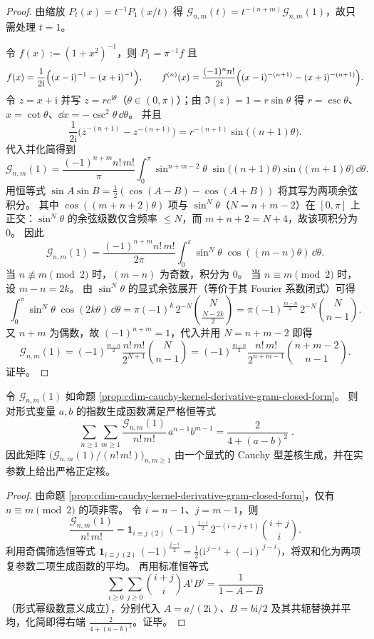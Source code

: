 \begin{proof}
由缩放 \(P_t(x)=t^{-1}P_1(x/t)\) 得
\(
\mathcal G_{n,m}(t)=t^{-(n+m)}\mathcal G_{n,m}(1)
\)，故只需处理 \(t=1\)。
\par
令 \(f(x):=(1+x^2)^{-1}\)，则 \(P_1=\pi^{-1}f\) 且
\[
f(x)=\frac{1}{2\mathrm{i}}\Bigl((x-\mathrm{i})^{-1}-(x+\mathrm{i})^{-1}\Bigr),
\qquad
f^{(n)}(x)=\frac{(-1)^n n!}{2\mathrm{i}}\Bigl((x-\mathrm{i})^{-(n+1)}-(x+\mathrm{i})^{-(n+1)}\Bigr).
\]
令 \(z=x+\mathrm{i}\) 并写 \(z=re^{\mathrm{i}\theta}\)（\(\theta\in(0,\pi)\)）；由 \(\Im(z)=1=r\sin\theta\) 得 \(r=\csc\theta\)、\(x=\cot\theta\)、\(\dd x=-\csc^2\theta\,\dd\theta\)。
并且
\[
\frac{1}{2\mathrm{i}}\bigl(\overline z^{-(n+1)}-z^{-(n+1)}\bigr)
=r^{-(n+1)}\sin\bigl((n+1)\theta\bigr).
\]
代入并化简得到
\[
\mathcal G_{n,m}(1)
=\frac{(-1)^{n+m}n!\,m!}{\pi}
\int_{0}^{\pi}\sin^{n+m-2}\theta\;
\sin\bigl((n+1)\theta\bigr)\sin\bigl((m+1)\theta\bigr)\,\dd\theta.
\]
用恒等式 \(\sin A\sin B=\tfrac12(\cos(A-B)-\cos(A+B))\) 将其写为两项余弦积分。
其中 \(\cos((m+n+2)\theta)\) 项与 \(\sin^{N}\theta\)（\(N=n+m-2\)）在 \([0,\pi]\) 上正交：\(\sin^{N}\theta\) 的余弦级数仅含频率 \(\le N\)，而 \(m+n+2=N+4\)，故该项积分为 \(0\)。
因此
\[
\mathcal G_{n,m}(1)
=\frac{(-1)^{n+m}n!\,m!}{2\pi}\int_{0}^{\pi}\sin^{N}\theta\;\cos((m-n)\theta)\,\dd\theta.
\]
当 \(n\not\equiv m\pmod 2\) 时，\((m-n)\) 为奇数，积分为 \(0\)。
当 \(n\equiv m\pmod 2\) 时，设 \(m-n=2k\)。
由 \(\sin^{N}\theta\) 的显式余弦展开（等价于其 Fourier 系数闭式）可得
\[
\int_{0}^{\pi}\sin^{N}\theta\;\cos(2k\theta)\,\dd\theta
=\pi(-1)^k\,2^{-N}\binom{N}{\frac{N-2k}{2}}
=\pi(-1)^{\frac{m-n}{2}}\,2^{-N}\binom{N}{n-1}.
\]
又 \(n+m\) 为偶数，故 \((-1)^{n+m}=1\)，代入并用 \(N=n+m-2\) 即得
\[
\mathcal G_{n,m}(1)=(-1)^{\frac{m-n}{2}}\frac{n!\,m!}{2^{N+1}}\binom{N}{n-1}
=(-1)^{\frac{m-n}{2}}\frac{n!\,m!}{2^{n+m-1}}\binom{n+m-2}{n-1}.
\]
证毕。
\end{proof}

\begin{proposition}\label{prop:cdim-cauchy-derivative-gram-exponential-kernel}
令 \(\mathcal G_{n,m}(1)\) 如命题 \ref{prop:cdim-cauchy-kernel-derivative-gram-closed-form}。
则对形式变量 \(a,b\) 的指数生成函数满足严格恒等式
\[
\boxed{\;
\sum_{n\ge 1}\sum_{m\ge 1}\frac{\mathcal G_{n,m}(1)}{n!\,m!}\,a^{n-1}b^{m-1}
=\frac{2}{4+(a-b)^2}\; }.
\]
因此矩阵 \(\bigl(\mathcal G_{n,m}(1)/(n!\,m!)\bigr)_{n,m\ge 1}\) 由一个显式的 Cauchy 型差核生成，并在实参数上给出严格正定核。
\end{proposition}
\begin{proof}
由命题 \ref{prop:cdim-cauchy-kernel-derivative-gram-closed-form}，仅有 \(n\equiv m\pmod 2\) 的项非零。
令 \(i=n-1\)、\(j=m-1\)，则
\[
\frac{\mathcal G_{n,m}(1)}{n!\,m!}
=\mathbf 1_{i\equiv j\ (2)}\,(-1)^{\frac{j-i}{2}}\,2^{-(i+j+1)}\binom{i+j}{i}.
\]
利用奇偶筛选恒等式
\(
\mathbf 1_{i\equiv j\ (2)}\,(-1)^{\frac{j-i}{2}}=\frac12\bigl(\mathrm{i}^{\,j-i}+(-\mathrm{i})^{\,j-i}\bigr)
\)，将双和化为两项复参数二项生成函数的平均。
再用标准恒等式
\[
\sum_{i\ge 0}\sum_{j\ge 0}\binom{i+j}{i}A^iB^j=\frac{1}{1-A-B}
\]
（形式幂级数意义成立），分别代入 \(A=a/(2\mathrm{i})\)、\(B=b\mathrm{i}/2\) 及其共轭替换并平均，化简即得右端 \(\frac{2}{4+(a-b)^2}\)。证毕。
\end{proof}

